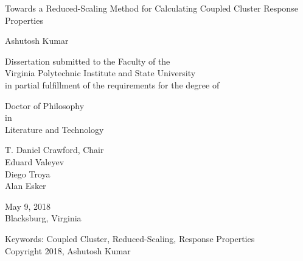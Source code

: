 \documentclass[12pt]{report}
\begin{document}
\thispagestyle{empty}
\begin{center}

{\Large 
Towards a Reduced-Scaling Method for Calculating Coupled Cluster Response Properties
}

\vfill

Ashutosh Kumar

\vfill

Dissertation submitted to the Faculty of the \\
Virginia Polytechnic Institute and State University \\
in partial fulfillment of the requirements for the degree of

\vfill

Doctor of Philosophy \\
in \\
Literature and Technology

\vfill

T. Daniel Crawford, Chair \\
Eduard Valeyev \\
Diego Troya \\
Alan Esker

\vfill

May 9, 2018 \\
Blacksburg, Virginia

\vfill

Keywords: Coupled Cluster, Reduced-Scaling, Response Properties
\\
Copyright 2018, Ashutosh Kumar

\end{center}

\pagebreak
\end{document}

